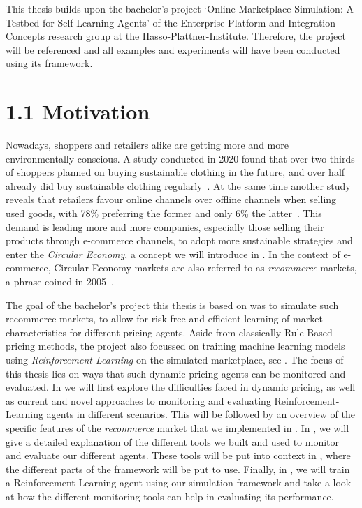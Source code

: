 \begin{jointwork}
	This thesis builds upon the bachelor's project `Online Marketplace Simulation: A Testbed for Self-Learning Agents' of the Enterprise Platform and Integration Concepts research group at the Hasso-Plattner-Institute. Therefore, the project will be referenced and all examples and experiments will have been conducted using its framework.
\end{jointwork}

\section*{1.1 Motivation}

Nowadays, shoppers and retailers alike are getting more and more environmentally conscious. A study conducted in 2020 found that over two thirds of shoppers planned on buying sustainable clothing in the future, and over half already did buy sustainable clothing regularly~\cite{StatistaSustainableClothing}. At the same time another study reveals that retailers favour online channels over offline channels when selling used goods, with 78\% preferring the former and only 6\% the latter~\cite{StatistaUsedRetailers}. This demand is leading more and more companies, especially those selling their products through e-commerce channels, to adopt more sustainable strategies and enter the \emph{Circular Economy}, a concept we will introduce in . In the context of e-commerce, Circular Economy markets are also referred to as \emph{recommerce} markets, a phrase coined in 2005~\cite{RecommerceDefinition}.

The goal of the bachelor's project this thesis is based on was to simulate such recommerce markets, to allow for risk-free and efficient learning of market characteristics for different pricing agents. Aside from classically Rule-Based pricing methods, the project also focussed on training machine learning models using \emph{Reinforcement-Learning} on the simulated marketplace, see . The focus of this thesis lies on ways that such dynamic pricing agents can be monitored and evaluated. In  we will first explore the difficulties faced in dynamic pricing, as well as current and novel approaches to monitoring and evaluating Reinforcement-Learning agents in different scenarios. This will be followed by an overview of the specific features of the \emph{recommerce} market that we implemented in . In , we will give a detailed explanation of the different tools we built and used to monitor and evaluate our different agents. These tools will be put into context in , where the different parts of the framework will be put to use. Finally, in , we will train a Reinforcement-Learning agent using our simulation framework and take a look at how the different monitoring tools can help in evaluating its performance.

